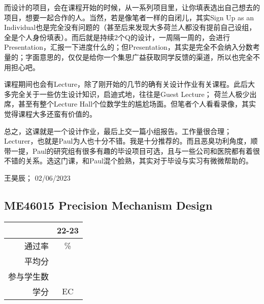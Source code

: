 而设计的项目，会在课程开始的时候，从一系列项目里，让你填表选出自己想去的项目，想要一起合作的人。当然，若是像笔者一样的自闭儿，其实Sign Up as an Individual也是完全没有问题的（甚至后来发现大多荷兰人都没有提前自己设组，全是个人身份填表）。而后就是持续2个Q的设计，一周隔一周的，会进行Presentation，汇报一下进度什么的；但Presentation，其实是完全不会纳入分数考量的；字面意思的，仅仅是给你一个集思广益获取同学反馈的渠道，所以也完全不用担心吧。

课程期间也会有Lecture，除了刚开始的几节的确有关设计作业有关课程。此后大多完全关于一些仿生设计知识，启迪式地，往往是Guest Lecture； 荷兰人极少出席，甚至有整个Lecture Hall个位数学生的尴尬场面。但笔者个人看看录像，其实觉得课程大多还蛮有价值的。

总之，这课就是一个设计作业，最后上交一篇小组报告。工作量很合理；Lecturer，也就是Paul为人也十分不错。我是十分推荐的。而且恶臭功利角度，顺带一提，Paul的研究组有很多有趣的毕设项目可选，且与一些公司和医院都有着很不错的关系。选这门课，和Paul混个脸熟，其实对于毕设与实习有微微帮助的。
\begin{flushright}
王昊辰； 02/06/2023
\end{flushright}

\subsection{ME46015 Precision Mechanism Design}\hypertarget{ME46015}{} 
\begin{minipage}{0.45\textwidth}
\centering
{}
\end{minipage}%
\begin{minipage}{0.45\textwidth}
\raggedleft
\begin{tabular}{r|c}
\textbf{ } & \textbf{22-23} \\ \hline
通过率 & \%\\ 
平均分 &  \\ 
参与学生数 &  \\ 
学分 &  EC\\
\end{tabular}
\end{minipage}\\

